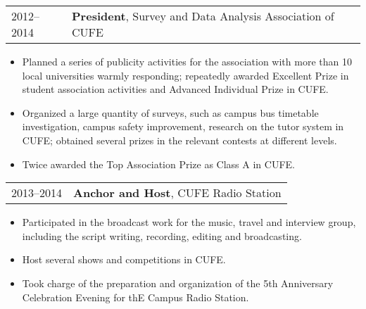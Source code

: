 \documentclass[10pt,a4paper,]{article}
\providecommand{\tightlist}{%
  \setlength{\itemsep}{0pt}\setlength{\parskip}{0pt}}
\begin{document}
\begin{tabular}{ll}
  2012--2014 & \textbf{President}, Survey and Data Analysis Association of CUFE \\ 
  \end{tabular}

\begin{itemize}
\tightlist
\item
  Planned a series of publicity activities for the association with more than 10 local universities warmly responding; repeatedly awarded Excellent Prize in student association activities and Advanced Individual Prize in CUFE.
\item
  Organized a large quantity of surveys, such as campus bus timetable investigation, campus safety improvement, research on the tutor system in CUFE; obtained several prizes in the relevant contests at different levels.
\item
  Twice awarded the Top Association Prize as Class A in CUFE.
\end{itemize}

\begin{tabular}{ll}
  2013--2014 & \textbf{Anchor and Host}, CUFE Radio Station \\ 
  \end{tabular}

\begin{itemize}
\tightlist
\item
  Participated in the broadcast work for the music, travel and interview group, including the script writing, recording, editing and broadcasting.
\item
  Host several shows and competitions in CUFE.
\item
  Took charge of the preparation and organization of the 5th Anniversary Celebration Evening
  for thE Campus Radio Station.
\end{itemize}
\end{document}
